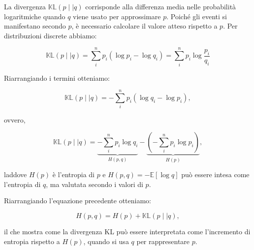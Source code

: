 \documentclass[
  11pt,
]{krantz}
\newcommand{\E}{\mathbb{E}} %
\theoremstyle{definition}
\theoremstyle{definition}
\theoremstyle{definition}
\theoremstyle{definition}
\theoremstyle{remark}
\begin{document}
La divergenza \(\mathbb{KL} (p \mid\mid q)\) corrisponde alla differenza media nelle probabilità logaritmiche quando \(q\) viene usato per approssimare \(p\). Poiché gli eventi si manifestano secondo \(p\), è necessario calcolare il valore atteso rispetto a \(p\). Per distribuzioni discrete abbiamo:

\begin{equation}
\mathbb{KL} (p \mid\mid q) = \sum_i^n p_i (\log p_i - \log q_i) = \sum_i^n p_i \log \frac{p_i}{q_i}
\end{equation}

Riarrangiando i termini otteniamo:

\begin{equation}
\mathbb{KL} (p \mid\mid q) = -\sum_i^n p_i (\log q_i - \log p_i),
\end{equation}

ovvero,

\begin{equation}
\mathbb{KL} (p \mid\mid q) = \underbrace{-\sum_i^n p_i \log q_i}_{H(p, q)} - \underbrace{\left(-\sum_i^n p_i \log p_i\right)}_{H(p)},
\end{equation}

laddove \(H(p)\) è l'entropia di \(p\) e \(H(p, q) = −\E [\log q]\) può essere intesa come l'entropia di \(q\), ma valutata secondo i valori di \(p\).

Riarrangiando l'equazione precedente otteniamo:

\begin{equation}
H(p, q) = H(p) + \mathbb{KL} (p \mid\mid q),
\end{equation}

il che mostra come la divergenza KL può essere interpretata come l'incremento di entropia rispetto a \(H(p)\), quando si usa \(q\) per rappresentare \(p\).
\end{document}
